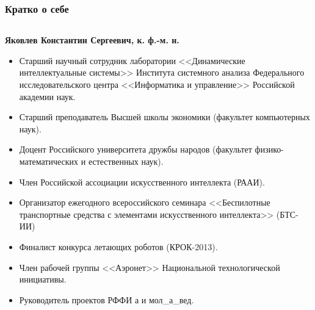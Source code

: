 \documentclass[default]{beamer}
\begin{document}
	\begin{frame}
		\frametitle{Кратко о себе}
		\scriptsize
		\begin{columns}
			\begin{column}{0.85\textwidth}
				\textbf{Яковлев Константин Сергеевич, к. ф.-м. н.}
				\begin{itemize}
					\item Старший научный сотрудник лаборатории <<Динамические интеллектуальные системы>> Института системного анализа Федерального исследовательского центра <<Информатика и управление>> Российской академии наук.
					\item Старший преподаватель Высшей школы экономики (факультет компьютерных наук).
					\item Доцент Российского университета дружбы народов (факультет физико-математических и естественных наук).
					\item Член Российской ассоциации искусственного интеллекта (РААИ).
					\item Организатор ежегодного всероссийского семинара <<Беспилотные транспортные средства с элементами искусственного интеллекта>> (БТС-ИИ)
					\item Финалист конкурса летающих роботов (КРОК-2013).
					\item Член рабочей группы <<Аэронет>> Национальной технологической инициативы.
					\item Руководитель проектов РФФИ а и мол\_а\_вед.
				\end{itemize}
			\end{column}
			

\end{columns}
\end{frame}
\end{document}
